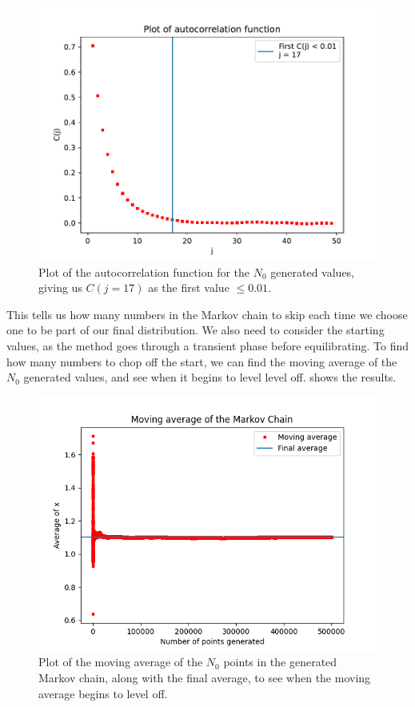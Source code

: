\documentclass[11pt]{article}
\begin{document}
\begin{enumerate}
\begin{enumerate}
        \begin{figure}[h]
            \begin{center}
                \includegraphics[width=.75\textwidth]{Plots/correlation.pdf}
                \caption{Plot of the autocorrelation function for the $N_0$ generated values, giving us $C(j=17)$ as the first value $\leq 0.01$. }
                \label{fig:correlation}
            \end{center}
        \end{figure}

        This tells us how many numbers in the Markov chain to skip each time we choose one to be part of our final distribution. We also need to consider the starting values, as the method goes through a transient phase before equilibrating. To find how many numbers to chop off the start, we can find the moving average of the $N_0$ generated values, and see when it begins to level level off.  shows the results.

        \begin{figure}[h]
            \begin{center}
                \includegraphics[width=.75\textwidth]{Plots/equilibrium.png}
                \caption{Plot of the moving average of the $N_0$ points in the generated Markov chain, along with the final average, to see when the moving average begins to level off.}
                \label{fig:equilibrium}
            \end{center}
        \end{figure}
        

\end{enumerate}
\end{enumerate}
\end{document}
